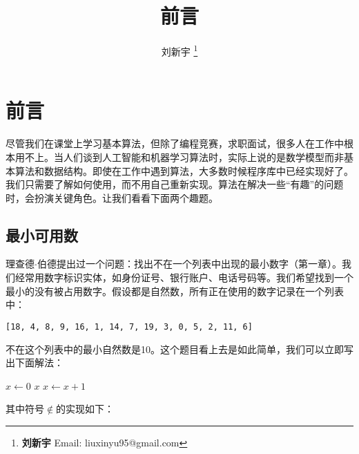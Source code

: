 \documentclass[b5paper]{ctexart}
\begin{document}

\title{前言}

\author{刘新宇
\thanks{{\bfseries 刘新宇} \newline
  Email: liuxinyu95@gmail.com \newline}
  }

\maketitle
\fi


\chapter*{前言}

尽管我们在课堂上学习基本算法，但除了编程竞赛，求职面试，很多人在工作中根本用不上。当人们谈到人工智能和机器学习算法时，实际上说的是数学模型而非基本算法和数据结构。即使在工作中遇到算法，大多数时候程序库中已经实现好了。我们只需要了解如何使用，而不用自己重新实现。算法在解决一些“有趣”的问题时，会扮演关键角色。让我们看看下面两个趣题。

\section*{最小可用数}
\label{min-free} 

理查德$\cdot$伯德提出过一个问题：找出不在一个列表中出现的最小数字（\cite{fp-pearls}第一章）。我们经常用数字标识实体，如身份证号、银行账户、电话号码等。我们希望找到一个最小的没有被占用数字。假设都是自然数，所有正在使用的数字记录在一个列表中：

\begin{Verbatim}[fontsize=\footnotesize]
[18, 4, 8, 9, 16, 1, 14, 7, 19, 3, 0, 5, 2, 11, 6]
\end{Verbatim}

不在这个列表中的最小自然数是10。这个题目看上去是如此简单，我们可以立即写出下面解法：

\begin{algorithmic}[1]
  \State $x \gets 0$
  \Loop
      \State \Return $x$
    \Else
      \State $x \gets x + 1$
    \EndIf
  \EndLoop
\EndFunction
\end{algorithmic}

其中符号$\notin$的实现如下：
\end{document}
